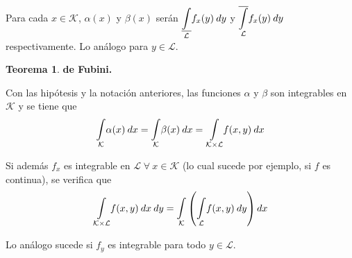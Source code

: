 \documentclass[12pt,twoside]{report}
\newcommand\mc[1]{\mathcal{#1}}
\theoremstyle{azul}
\theoremstyle{azul2}
\theoremstyle{plain}
\theoremstyle{definition}
\newtheorem{teo}{Teorema}[chapter]
\theoremstyle{remark}
\begin{document}
Para cada $x \in \mc{K}$, $\alpha(x)$ y $\beta(x)$ serán $\underset{\mc{L}}{\underline{\mathlarger{\int}}} f_x(y) \: dy$ y $\underset{\mc{L}}{\overline{\mathlarger{\int}}} f_x(y) \: dy$ respectivamente. Lo análogo para $y \in \mc{L}$. 

\begin{teo} \textbf{de Fubini.}

Con las hipótesis y la notación anteriores, las funciones $\alpha$ y $\beta$ son integrables en $\mc{K}$ y se tiene que 
$$\underset{\mc{K}}{\mathlarger{\int}} \alpha (x)\: dx=\underset{\mc{K}}{\mathlarger{\int}} \beta (x)\: dx=\underset{\mc{K} \times \mc{L}}{\mathlarger{\int}} f (x,y)\: dx$$

Si además $f_x$ es integrable en $\mc{L} \; \forall \: x \in \mc{K}$ (lo cual sucede por ejemplo, si $f$ es continua), se verifica que 
$$\underset{\mc{K} \times \mc{L}}{\mathlarger{\int}} f (x,y)\: dx \: dy= \underset{\mc{K}}{\mathlarger{\int}} \left( \underset{\mc{L}}{\mathlarger{\int}} f (x,y)\: dy \right) dx$$

Lo análogo sucede si $f_y$ es integrable para todo $y \in \mc{L}$.
\end{teo}
\end{document}
